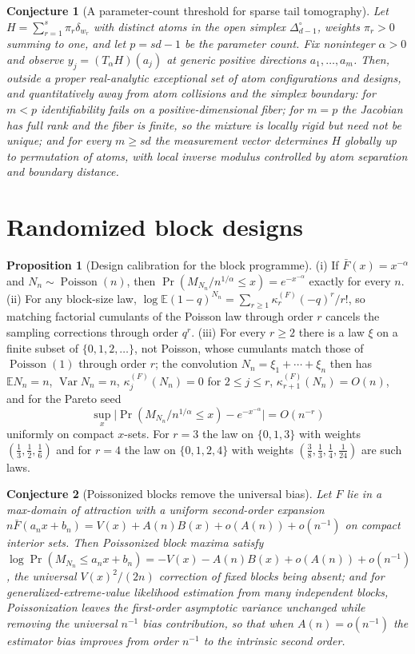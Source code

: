 \documentclass[11pt]{article}
\newtheorem{conjecture}{Conjecture}
\theoremstyle{definition}
\newcommand{\E}{\mathbb E}
\providecommand{\E}{\mathbb E}
\newtheorem{proposition}{Proposition}
\begin{document}
\begin{conjecture}[A parameter-count threshold for sparse tail tomography]\label{ah10}
Let $H=\sum_{r=1}^s\pi_r\delta_{w_r}$ with distinct atoms in the open simplex $\Delta_{d-1}^\circ$, weights $\pi_r>0$ summing to one, and let $p=sd-1$ be the parameter count.  Fix noninteger $\alpha>0$ and observe $y_j=(T_\alpha H)(a_j)$ at generic positive directions $a_1,\ldots,a_m$.  Then, outside a proper real-analytic exceptional set of atom configurations and designs, and quantitatively away from atom collisions and the simplex boundary: for $m<p$ identifiability fails on a positive-dimensional fiber; for $m=p$ the Jacobian has full rank and the fiber is finite, so the mixture is locally rigid but need not be unique; and for every $m\ge sd$ the measurement vector determines $H$ globally up to permutation of atoms, with local inverse modulus controlled by atom separation and boundary distance.
\end{conjecture}

\section{Randomized block designs}

\begin{proposition}[Design calibration for the block programme]\label{ah:block}
(i) If $\bar F(x)=x^{-\alpha}$ and $N_n\sim\operatorname{Poisson}(n)$, then $\Pr(M_{N_n}/n^{1/\alpha}\le x)=e^{-x^{-\alpha}}$ exactly for every $n$.  (ii) For any block-size law, $\log\E(1-q)^{N_n}=\sum_{r\ge1}\kappa_r^{(F)}(-q)^r/r!$, so matching factorial cumulants of the Poisson law through order $r$ cancels the sampling corrections through order $q^r$.  (iii) For every $r\ge2$ there is a law $\xi$ on a finite subset of $\{0,1,2,\ldots\}$, not Poisson, whose cumulants match those of $\operatorname{Poisson}(1)$ through order $r$; the convolution $N_n=\xi_1+\cdots+\xi_n$ then has $\E N_n=n$, $\operatorname{Var}N_n=n$, $\kappa_j^{(F)}(N_n)=0$ for $2\le j\le r$, $\kappa_{r+1}^{(F)}(N_n)=O(n)$, and for the Pareto seed
\[
\sup_x\bigl|\Pr(M_{N_n}/n^{1/\alpha}\le x)-e^{-x^{-\alpha}}\bigr|=O(n^{-r})
\]
uniformly on compact $x$-sets.  For $r=3$ the law on $\{0,1,3\}$ with weights $(\tfrac13,\tfrac12,\tfrac16)$ and for $r=4$ the law on $\{0,1,2,4\}$ with weights $(\tfrac38,\tfrac13,\tfrac14,\tfrac1{24})$ are such laws.
\end{proposition}

\begin{conjecture}[Poissonized blocks remove the universal bias]\label{ah11}
Let $F$ lie in a max-domain of attraction with a uniform second-order expansion $n\bar F(a_nx+b_n)=V(x)+A(n)B(x)+o(A(n))+o(n^{-1})$ on compact interior sets.  Then Poissonized block maxima satisfy $\log\Pr(M_{N_n}\le a_nx+b_n)=-V(x)-A(n)B(x)+o(A(n))+o(n^{-1})$, the universal $V(x)^2/(2n)$ correction of fixed blocks being absent; and for generalized-extreme-value likelihood estimation from many independent blocks, Poissonization leaves the first-order asymptotic variance unchanged while removing the universal $n^{-1}$ bias contribution, so that when $A(n)=o(n^{-1})$ the estimator bias improves from order $n^{-1}$ to the intrinsic second order.
\end{conjecture}
\end{document}
